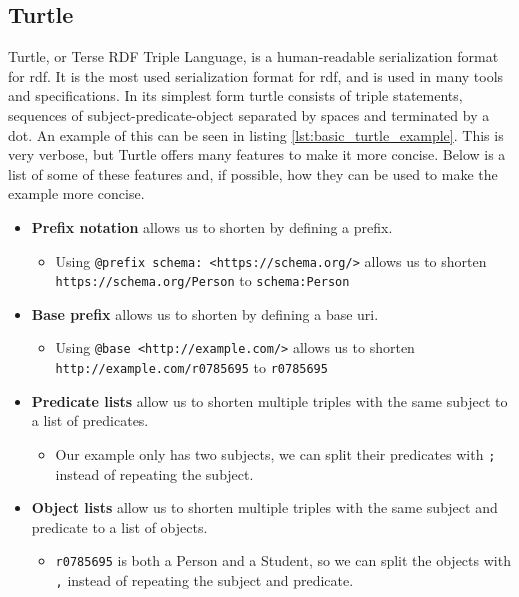 \subsection{Turtle}
Turtle, or Terse RDF Triple Language, is a human-readable serialization format for \acrshort{rdf}. It is the most used serialization format for \acrshort{rdf}, and is used in many tools and specifications.
In its simplest form turtle consists of triple statements, sequences of subject-predicate-object separated by spaces and terminated by a dot. An example of this can be seen in listing \ref{lst:basic_turtle_example}. This is very verbose, but Turtle offers many features to make it more concise. Below is a list of some of these features and, if possible, how they can be used to make the example more concise.
\begin{itemize}
    \item \textbf{Prefix notation} allows us to shorten  by defining a prefix.
          \begin{itemize}
              \item Using \texttt{@prefix schema: <https://schema.org/>} allows us to shorten \break\texttt{https://schema.org/Person} to \texttt{schema:Person}
          \end{itemize}
    \item \textbf{Base prefix} allows us to shorten  by defining a base \acrshort{uri}.
          \begin{itemize}
              \item Using \texttt{@base <http://example.com/>} allows us to shorten \break\texttt{http://example.com/r0785695} to \texttt{r0785695}
          \end{itemize}
    \item \textbf{Predicate lists} allow us to shorten multiple triples with the same subject to a list of predicates.
          \begin{itemize}
              \item Our example only has two subjects, we can split their predicates with \texttt{;} instead of repeating the subject.
          \end{itemize}
    \item \textbf{Object lists} allow us to shorten multiple triples with the same subject and predicate to a list of objects.
          \begin{itemize}
              \item \texttt{r0785695} is both a Person and a Student, so we can split the objects with \texttt{,} instead of repeating the subject and predicate.

\end{itemize}
\end{itemize}
